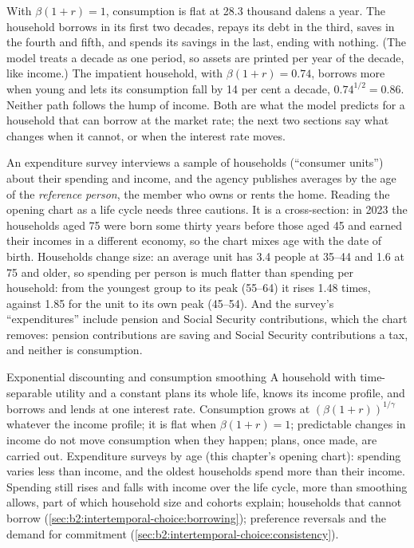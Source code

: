 \label{out:b2:intertemporal-choice:life-plan}

With $\beta(1 + r) = 1$, consumption is flat at 28.3 thousand dalens a year. The household borrows in
its first two decades, repays its debt in the third, saves in the fourth and fifth, and spends its
savings in the last, ending with nothing. (The model treats a decade as one period, so assets are
printed per year of the decade, like income.) The impatient household, with $\beta(1 + r) = 0.74$, borrows more when young and lets
its consumption fall by 14 per cent a decade, $0.74^{1/2} = 0.86$. Neither path follows the hump of
income. Both are what the model predicts for a household that can borrow at the market rate; the next
two sections say what changes when it cannot, or when the interest rate moves.

\begin{measure}
An expenditure survey interviews a sample of households (``consumer units'') about their spending and
income, and the agency publishes averages by the age of the \emph{reference person}, the member who
owns or rents the home. Reading the opening chart as a life cycle needs three cautions. It is a
cross-section: in 2023 the households aged 75 were born some thirty years before those aged 45 and
earned their incomes in a different economy, so the chart mixes age with the date of birth. Households change size: an average unit
has 3.4 people at 35--44 and 1.6 at 75 and older, so spending per person is much flatter than spending
per household: from the youngest group to its peak (55--64) it rises 1.48 times, against 1.85 for
the unit to its own peak (45--54). And the survey's ``expenditures'' include pension and Social Security
contributions, which the chart removes: pension contributions are saving and Social Security contributions a
tax, and neither is consumption.
\end{measure}

\begin{model}{Exponential discounting and consumption smoothing}
\assumes A household with time-separable utility and a constant  plans its whole life,
knows its income profile, and borrows and lends at one interest rate.
\predicts Consumption grows at $(\beta(1 + r))^{1/\gamma}$ whatever the income profile; it is flat when
$\beta(1 + r) = 1$; predictable changes in income do not move consumption when they happen; plans,
once made, are carried out.
\tested Expenditure surveys by age (this chapter's opening chart): spending varies less than income,
and the oldest households spend more than their income.
\breaks Spending still rises and falls with income over the life cycle, more than smoothing allows,
part of which household size and cohorts explain; households that cannot borrow
(\cref{sec:b2:intertemporal-choice:borrowing}); preference reversals and the demand for commitment
(\cref{sec:b2:intertemporal-choice:consistency}).
\end{model}

